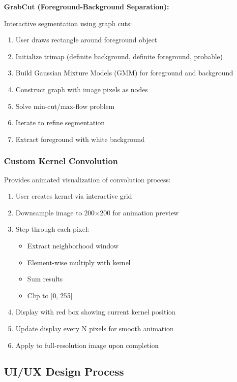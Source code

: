 \documentclass[12pt,a4paper]{article}
\begin{document}
\textbf{GrabCut (Foreground-Background Separation):}

Interactive segmentation using graph cuts:
\begin{enumerate}
    \item User draws rectangle around foreground object
    \item Initialize trimap (definite background, definite foreground, probable)
    \item Build Gaussian Mixture Models (GMM) for foreground and background
    \item Construct graph with image pixels as nodes
    \item Solve min-cut/max-flow problem
    \item Iterate to refine segmentation
    \item Extract foreground with white background
\end{enumerate}

\subsubsection{Custom Kernel Convolution}

Provides animated visualization of convolution process:
\begin{enumerate}
    \item User creates kernel via interactive grid
    \item Downsample image to 200×200 for animation preview
    \item Step through each pixel:
    \begin{itemize}
        \item Extract neighborhood window
        \item Element-wise multiply with kernel
        \item Sum results
        \item Clip to [0, 255]
    \end{itemize}
    \item Display with red box showing current kernel position
    \item Update display every N pixels for smooth animation
    \item Apply to full-resolution image upon completion
\end{enumerate}

\subsection{UI/UX Design Process}
\end{document}
